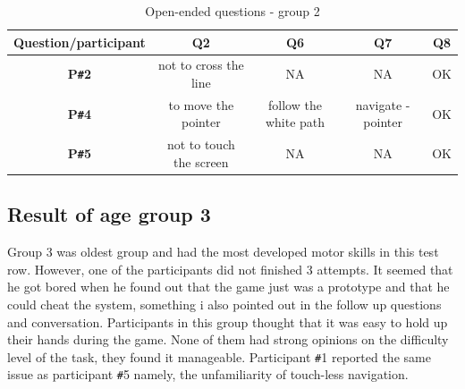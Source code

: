 \begin{table}[!ht]
    \centering
    \begin{tabular}{c|c|c|c|c}
    \hline
    \multicolumn{1}{|c|}{\textbf{Question/participant}} &
    \multicolumn{1}{c|}{\textbf{Q2}} &
    \multicolumn{1}{c|}{\textbf{Q6}} &
    \multicolumn{1}{c|}{\textbf{Q7}} &
    \multicolumn{1}{c|}{\textbf{Q8}} \\ \hline
    \multicolumn{1}{|c|}{\textbf{P\texttt{\#}2}} &
    \multicolumn{1}{c|}{not to cross the line} &
    \multicolumn{1}{c|}{NA} &
    \multicolumn{1}{c|}{NA} &
    \multicolumn{1}{c|}{OK} \\ \hline
    \multicolumn{1}{|c|}{\textbf{P\texttt{\#}4}} &
    \multicolumn{1}{c|}{to move the pointer} &
    \multicolumn{1}{c|}{follow the white path} &
    \multicolumn{1}{c|}{navigate - pointer} &
    \multicolumn{1}{c|}{OK} \\ \hline
    \multicolumn{1}{|c|}{\textbf{P\texttt{\#}5}} &
    \multicolumn{1}{c|}{not to touch the screen} &
    \multicolumn{1}{c|}{NA} &
    \multicolumn{1}{c|}{NA} &
    \multicolumn{1}{c|}{OK} \\ \hline
    \end{tabular}
    \caption{Open-ended questions - group 2}
    \label{tab:openendedquestiongroup2}
\end{table}

\newpage

\subsection{Result of age group 3}
Group 3 was oldest group and had the most developed motor skills in this test row. However, one of the participants did not finished 3 attempts. It seemed that he got bored when he found out that the game just was a prototype and that he could cheat the system, something i also pointed out in the follow up questions and conversation.
Participants in this group thought that it was easy to hold up their hands during the game. None of them had strong opinions on the difficulty level of the task, they found it manageable.
Participant \texttt{\#}1 reported the same issue as participant \texttt{\#}5 namely, the unfamiliarity of touch-less navigation. 

